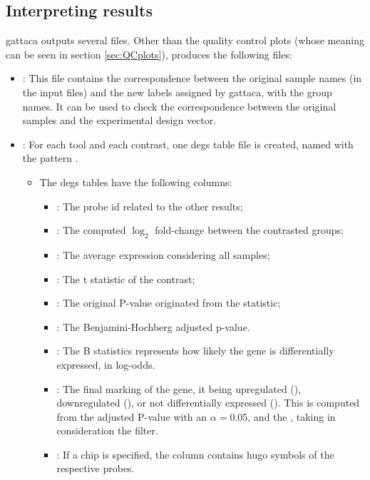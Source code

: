 \subsection{Interpreting results}
\gls{gattaca} outputs several files. Other than the quality control plots (whose meaning can be seen in section \ref{sec:QCplots}),  produces the following files:
\begin{itemize}
    \item {}: This file contains the correspondence between the original sample names (in the input files) and the new labels assigned by \gls{gattaca}, with the group names. It can be used to check the correspondence between the original samples and the experimental design vector.
    \item {}: For each tool and each contrast, one \glspl{deg} table file is created, named with the pattern .
    \begin{itemize}
        \item The  \glspl{deg} tables have the following columns:
        \begin{itemize}
            \item {}: The probe id related to the other results;
            \item {}: The computed $\log_2$ fold-change between the contrasted groups;
            \item {}: The average expression considering all samples;
            \item {}: The t statistic of the contrast;
            \item {}: The original P-value originated from the  statistic;
            \item {}: The Benjamini-Hochberg adjusted p-value.
            \item {}: The B statistics represents how likely the gene is differentially expressed, in log-odds.
            \item {}: The final marking of the gene, it being upregulated (), downregulated (), or not differentially expressed (). This is computed from the adjusted P-value with an $\alpha = 0.05$, and the , taking in consideration the  filter.
            \item {}: If a chip is specified, the  column contains \gls{hugo} symbols of the respective probes.

\end{itemize}
\end{itemize}
\end{itemize}
